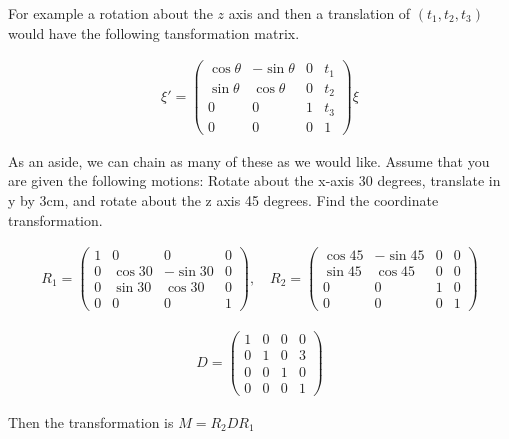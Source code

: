 For example a rotation about the \(z\) axis and then a translation of
\((t_1, t_2, t_3 )\) would have the following tansformation matrix.

\[\begin{aligned}
\xi' =
\begin{pmatrix}
\cos\theta & -\sin\theta & 0 & t_1 \\
\sin\theta & \cos\theta & 0 & t_2\\
0 &0 & 1 & t_3 \\
0& 0& 0& 1
\end{pmatrix}  \xi
\end{aligned}\]

As an aside, we can chain as many of these as we would like. Assume that
you are given the following motions: Rotate about the x-axis 30 degrees,
translate in y by 3cm, and rotate about the z axis 45 degrees. Find the
coordinate transformation.

\[\begin{aligned}
R_1 = \begin{pmatrix}1 & 0 & 0 & 0 \\ 0 & \cos 30 & -\sin 30 & 0  \\
         0& \sin 30 & \cos 30 & 0 \\
         0& 0& 0& 1 \end{pmatrix},  \quad R_2 =
         \begin{pmatrix}\cos 45 & -\sin 45 & 0 & 0 \\
         \sin 45 & \cos 45 & 0 & 0\\ 0 &0 & 1 & 0 \\
         0& 0& 0& 1 \end{pmatrix}
\end{aligned}\]

\[\begin{aligned}
D = \begin{pmatrix}1 & 0 & 0 & 0 \\
         0 & 1 & 0 & 3\\ 0 &0 & 1 & 0 \\
         0& 0& 0& 1 \end{pmatrix}
\end{aligned}\]

Then the transformation is \(M = R_2DR_1\)

